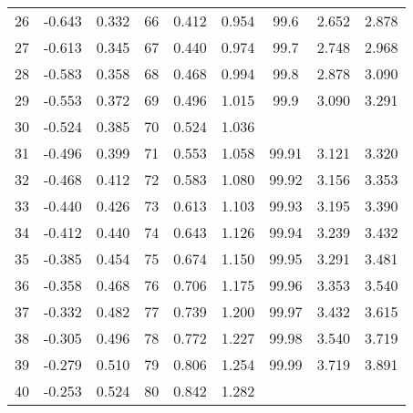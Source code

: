 \begin{table}
\begin{otherlanguage}{english}
\begin{tabular}{|C|C|C||C|C|C||C|C|C|}
26&-0.643&0.332&66&0.412&0.954&99.6&2.652&2.878\\
27&-0.613&0.345&67&0.440&0.974&99.7&2.748&2.968\\
28&-0.583&0.358&68&0.468&0.994&99.8&2.878&3.090\\
29&-0.553&0.372&69&0.496&1.015&99.9&3.090&3.291\\
30&-0.524&0.385&70&0.524&1.036&& &  \\[0.5ex]
31&-0.496&0.399&71&0.553&1.058&99.91&3.121&3.320\Tstrut \\
32&-0.468&0.412&72&0.583&1.080&99.92&3.156&3.353\\
33&-0.440&0.426&73&0.613&1.103&99.93&3.195&3.390\\
34&-0.412&0.440&74&0.643&1.126&99.94&3.239&3.432\\
35&-0.385&0.454&75&0.674&1.150&99.95&3.291&3.481\\[1ex]
36&-0.358&0.468&76&0.706&1.175&99.96&3.353&3.540\\
37&-0.332&0.482&77&0.739&1.200&99.97&3.432&3.615\\
38&-0.305&0.496&78&0.772&1.227&99.98&3.540&3.719\\
39&-0.279&0.510&79&0.806&1.254&99.99&3.719&3.891\\
40&-0.253&0.524&80&0.842&1.282&&& \\
\hline
\end{tabular}
\end{otherlanguage}
\end{table}
